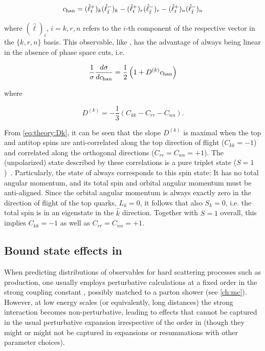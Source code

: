 \begin{equation}
    \label{eq:theory:chan}
    c_{\mathrm{han}} = (\hat{\ell}_t^+)_k (\hat{\ell}_{\bar{t}}^-)_k - (\hat{\ell}_t^+)_r (\hat{\ell}_{\bar{t}}^-)_r - (\hat{\ell}_t^+)_n (\hat{\ell}_{\bar{t}}^-)_n
\end{equation}

\noindent where $(\hat{\ell})_i$, $i=k,r,n$ refers to the $i$-th component of the respective vector in the $\{k,r,n\}$ basis. This observable, like \chel, has the advantage of always being linear in the absence of phase space cuts, i.e.

\begin{equation}
    \frac{1}{\sigma} \frac{d \sigma}{d c_{\mathrm{han}}} = \frac{1}{2}\left( 1 + D^{(k)} c_{\mathrm{han}} \right)
\end{equation}

\noindent where~\cite{Maltoni:2024tul}

\begin{equation}
\label{eq:theory:Dk}
    D^{(k)} = - \frac{1}{3} \left( C_{kk} - C_{rr} - C_{nn} \right) .
\end{equation}

From \cref{eq:theory:Dk}, it can be seen that the slope $D^{(k)}$ is maximal when the top and antitop spins are anti-correlated along the top direction of flight ($C_{kk} = -1$) and correlated along the orthogonal directions ($C_{rr} = C_{nn} = +1$). The (unpolarized) state described by these correlations is a pure triplet state ($S=1$)~\cite{Maltoni:2024tul}. Particularly, the  state of \ttbar always corresponds to this spin state: It has no total angular momentum, and its total spin and orbital angular momentum must be anti-aligned. Since the orbital angular momentum is always exactly zero in the direction of flight of the top quarks, $L_k = 0$, it follows that also $S_k = 0$, i.e. the total spin is in an eigenstate in the $\hat{k}$ direction. Together with $S=1$ overall, this implies $C_{kk} = -1$ as well as $C_{rr} = C_{nn} = +1$.



\subsection{Bound state effects in \ttbartitle}
\label{sec:theory:etat}

When predicting distributions of observables for hard scattering processes such as \ttbar production, one usually employs perturbative calculations at a fixed order in the strong coupling constant \alphas, possibly matched to a parton shower (see \cref{ch:mc}). However, at low energy scales (or equivalently, long distances) the strong interaction becomes non-perturbative, leading to effects that cannot be captured in the usual perturbative expansion irrespective of the order in \alphas (though they might or might not be captured in expansions or resummations with other parameter choices).

